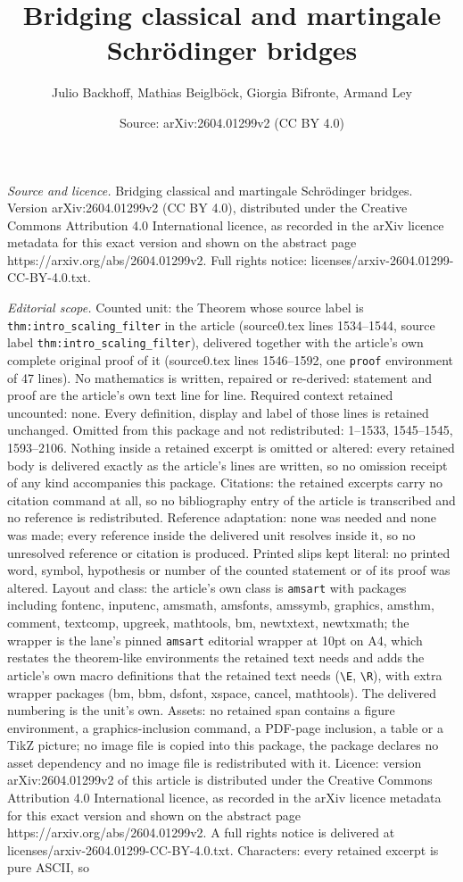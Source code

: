 \documentclass[10pt,a4paper]{amsart}
\title[Bridging classical and martingale Schr\"odinger bridges]{Bridging classical and martingale Schr\"odinger bridges}
\author{Julio Backhoff, Mathias Beiglb\"ock, Giorgia Bifronte, Armand Ley}
\date{Source: arXiv:2604.01299v2 (CC BY 4.0)}
\begin{document}
\maketitle

\noindent\emph{Source and licence.} Bridging classical and martingale Schr\"odinger bridges. Version arXiv:2604.01299v2 (CC BY 4.0), distributed under the Creative Commons Attribution 4.0 International licence, as recorded in the arXiv licence metadata for this exact version and shown on the abstract page https://arxiv.org/abs/2604.01299v2. Full rights notice: licenses/arxiv-2604.01299-CC-BY-4.0.txt.\par\smallskip

\noindent\textit{Editorial scope.} Counted unit: the Theorem whose source label is \texttt{thm:intro\_scaling\_filter} in the article (source0.tex lines 1534--1544, source label \texttt{thm:intro\_scaling\_filter}), delivered together with the article's own complete original proof of it (source0.tex lines 1546--1592, one \texttt{proof} environment of 47 lines). No mathematics is written, repaired or re-derived: statement and proof are the article's own text line for line. Required context retained uncounted: none. Every definition, display and label of those lines is retained unchanged. Omitted from this package and not redistributed: 1--1533, 1545--1545, 1593--2106. Nothing inside a retained excerpt is omitted or altered: every retained body is delivered exactly as the article's lines are written, so no omission receipt of any kind accompanies this package. Citations: the retained excerpts carry no citation command at all, so no bibliography entry of the article is transcribed and no reference is redistributed. Reference adaptation: none was needed and none was made; every reference inside the delivered unit resolves inside it, so no unresolved reference or citation is produced. Printed slips kept literal: no printed word, symbol, hypothesis or number of the counted statement or of its proof was altered. Layout and class: the article's own class is \texttt{amsart} with packages including fontenc, inputenc, amsmath, amsfonts, amssymb, graphics, amsthm, comment, textcomp, upgreek, mathtools, bm, newtxtext, newtxmath; the wrapper is the lane's pinned \texttt{amsart} editorial wrapper at 10pt on A4, which restates the theorem-like environments the retained text needs and adds the article's own macro definitions that the retained text needs (\texttt{\textbackslash E}, \texttt{\textbackslash R}), with extra wrapper packages (bm, bbm, dsfont, xspace, cancel, mathtools). The delivered numbering is the unit's own. Assets: no retained span contains a figure environment, a graphics-inclusion command, a PDF-page inclusion, a table or a TikZ picture; no image file is copied into this package, the package declares no asset dependency and no image file is redistributed with it. Licence: version arXiv:2604.01299v2 of this article is distributed under the Creative Commons Attribution 4.0 International licence, as recorded in the arXiv licence metadata for this exact version and shown on the abstract page https://arxiv.org/abs/2604.01299v2. A full rights notice is delivered at licenses/arxiv-2604.01299-CC-BY-4.0.txt. Characters: every retained excerpt is pure ASCII, so 
\end{document}
